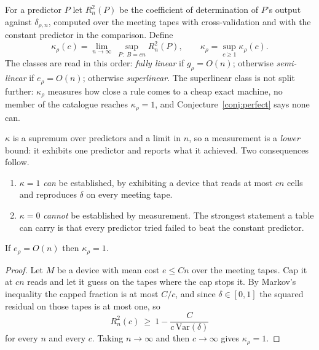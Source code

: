 \begin{definition}\label{def:kappadef}
For a predictor $P$ let $R^2_n(P)$ be the coefficient of determination of $P$'s output against
$\delta_{\rho,n}$, computed over the meeting tapes with cross-validation and with the constant
predictor in the comparison. Define
\[
\kappa_{\rho}(c)=\lim_{n\to\infty}\ \sup_{P\,:\,B=cn} R^2_n(P),
\qquad
\kappa_{\rho}=\sup_{c\ge1}\kappa_{\rho}(c).
\]
The classes are read in this order: \emph{fully linear} if $g_{\rho}=O(n)$; otherwise
\emph{semi-linear} if $e_{\rho}=O(n)$; otherwise \emph{superlinear}.  The superlinear class is
not split further: $\kappa_{\rho}$ measures how close a rule comes to a cheap exact machine, no
member of the catalogue reaches $\kappa_{\rho}=1$, and Conjecture~\ref{conj:perfect} says none can.
\end{definition}

\begin{remark}\label{rem:kappasup}
$\kappa$ is a supremum over predictors and a limit in $n$, so a measurement is a \emph{lower} bound:
it exhibits one predictor and reports what it achieved. Two consequences follow.
\begin{enumerate}
\item $\kappa=1$ \emph{can} be established, by exhibiting a device that reads at most $cn$ cells and
reproduces $\delta$ on every meeting tape.
\item $\kappa=0$ \emph{cannot} be established by measurement. The strongest statement a table can
carry is that every predictor tried failed to beat the constant predictor.
\end{enumerate}
\end{remark}

\begin{proposition}\label{prop:elinear}
If $e_{\rho}=O(n)$ then $\kappa_{\rho}=1$.
\end{proposition}

\begin{proof}
Let $M$ be a device with mean cost $e\le Cn$ over the meeting tapes. Cap it at $cn$ reads and let it
guess on the tapes where the cap stops it. By Markov's inequality the capped fraction is at most
$C/c$, and since $\delta\in[0,1]$ the squared residual on those tapes is at most one, so
\[
R^2_n(c)\ \ge\ 1-\frac{C}{c\,\mathrm{Var}(\delta)}
\]
for every $n$ and every $c$. Taking $n\to\infty$ and then $c\to\infty$ gives
$\kappa_{\rho}=1$.
\end{proof}

